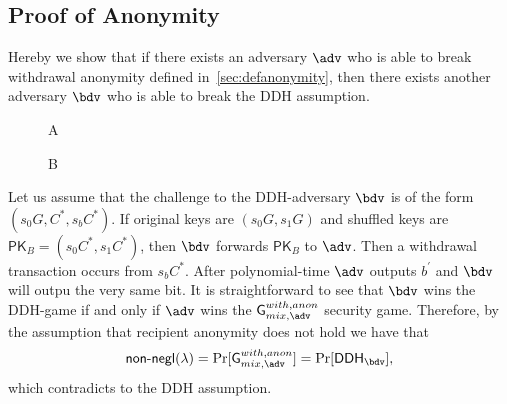 \documentclass[a4paper]{article}
\theoremstyle{definition}
\begin{document}
\begin{appendices}

\section{Proof of Anonymity}
Hereby we show that if there exists an adversary $\adv$ who is able to break withdrawal anonymity defined in~\ref{sec:defanonymity}, then there exists another adversary $\bdv$ who is able to break the DDH assumption.

\begin{figure}
	\centering
\begin{bbrenv}{A}
 \begin{bbrbox} [name=\bdv]

 \begin{bbrenv}{B}
 \begin{bbrbox}[name=\adv]
 \end{bbrbox}
 
 \end{bbrenv}

 \end{bbrbox}
 
\end{bbrenv}

\end{figure}

Let us assume that the challenge to the DDH-adversary $\bdv$ is of the form $(s_{0}G,C^{*},s_{b}C^{*})$. If original keys are $(s_{0}G, s_{1}G)$ and shuffled keys are $\textsf{PK}_{B}=(s_{0}C^{*}, s_{1}C^{*})$, then $\bdv$ forwards $\textsf{PK}_{B}$ to $\adv$. Then a withdrawal transaction occurs from $s_{b}C^{*}$. After polynomial-time $\adv$ outputs $b^{'}$ and $\bdv$ will outpu the very same bit. It is straightforward to see that $\bdv$ wins the DDH-game if and only if $\adv$ wins the $\textsf{G}^{with, anon}_{mix, \adv}$ security game. Therefore, by the assumption that recipient anonymity does not hold we have that $$\textsf{non-negl}(\lambda)=\Pr[\textsf{G}^{with, anon}_{mix, \adv}]=\Pr[\textsf{DDH}_{\bdv}],$$ which contradicts to the DDH assumption.


\end{appendices}
\end{document}
